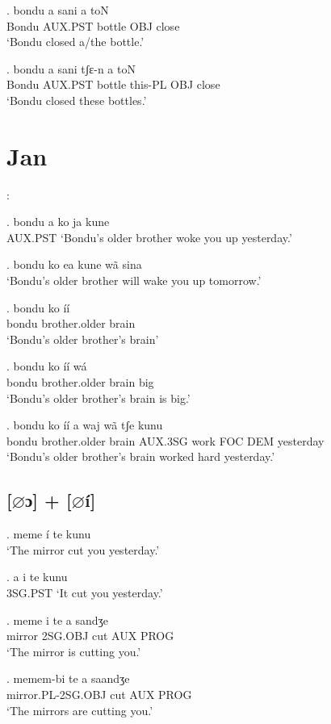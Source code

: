 \documentclass{assets/fieldnotes}
\begin{document}
\exg.
bondu   a   sani     a     toN   \\
Bondu   AUX.PST   bottle   OBJ   close \\%
`Bondu closed a/the bottle.'

\exg.
bondu   a   sani     tʃɛ-n     a     toN   \\
Bondu   AUX.PST   bottle   this-PL   OBJ   close \\%
`Bondu closed these bottles.'


\section{Jan}

:

\ex. bondu a ko ja kune \\
           AUX.PST
`Bondu's older brother woke you up yesterday.'

\ex. bondu ko ea kune wã sina \\
`Bondu's older brother will wake you up tomorrow.'

\exg. bondu ko íí \\
bondu brother.older brain \\
`Bondu's older brother's brain'

\exg. bondu ko íí wá \\
bondu brother.older brain big \\
`Bondu's older brother's brain is big.'

\exg. bondu ko íí a waj wã tʃe kunu \\
bondu brother.older brain AUX.3SG work FOC DEM yesterday \\
`Bondu's older brother's brain worked hard yesterday.'

\subsection{[$\varnothing$ɔ] + [$\varnothing$í]}

\ex. meme í te kunu \\
`The mirror cut you yesterday.'

\ex. a i te kunu \\
3SG.PST
`It cut you yesterday.'

\exg. meme i te a sandʒe \\
mirror 2SG.OBJ cut AUX PROG \\
`The mirror is cutting you.'

\exg. memem-bi te a saandʒe \\
mirror.PL-2SG.OBJ cut AUX PROG \\
`The mirrors are cutting you.'
\end{document}
